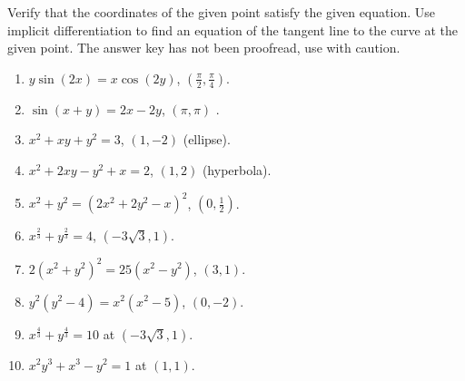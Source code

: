 Verify that the coordinates of the given point satisfy the given equation. Use implicit differentiation to find an equation of the tangent line to the curve at the given point. 
The answer key has not been proofread, use with caution.
\begin{multicols}{3}
\begin{enumerate}[ref={\fcProblemRef}]
\item \label{problemImplicitTangentysin(2x)=xcos(2y)point(pi/2,pi/4)} $y\sin (2x)=x\cos (2y) $, $\left(\frac{\pi}{2}, \frac{\pi}{4}\right)$. 

\item $ \sin (x+y)=2x-2y$, $(\pi,\pi)$ . 

\item $x^2+x y+y^2=3 $, $(1,-2)$ (ellipse). 

\item $x^2+2x y-y^2+x=2 $, $(1,2)$ (hyperbola). 

\item $x^2+y^2=(2x^2+2y^2-x)^2 $, $(0,\frac{1}{2})$. 

\item $x^{\frac{2}{3}}+y^{\frac{2}{3}}=4$, $(-3\sqrt{3},1)$. 

\item $2(x^2+y^2)^2 =25(x^2-y^2)$, $(3,1)$. 

\item $y^2(y^2-4)=x^2(x^2-5) $, $(0,-2)$. 

\item $x^{\frac{4}{3}}+y^{\frac{4}{3}}=10$ at $(-3\sqrt{3}, 1)$. 

\item $x^2y^3+x^3-y^2=1$ at $(1,1)$. 

\end{enumerate}
\end{multicols}
